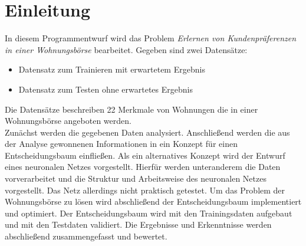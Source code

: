 \section{Einleitung}\label{sec:einleitung}
In diesem Programmentwurf wird das Problem \emph{Erlernen von Kundenpräferenzen in einer Wohnungsbörse}
bearbeitet. Gegeben sind zwei Datensätze: 
\begin{itemize}
    \item Datensatz zum Trainieren mit erwartetem Ergebnis
    \item Datensatz zum Testen ohne erwartetes Ergebnis
\end{itemize}

Die Datensätze beschreiben 22 Merkmale von Wohnungen die in einer Wohnungsbörse angeboten werden. \\
Zunächst werden die gegebenen Daten analysiert. Anschließend werden die aus der Analyse gewonnenen Informationen 
in ein Konzept für einen Entscheidungsbaum einfließen. 
Als ein alternatives Konzept wird der Entwurf eines neuronalen Netzes vorgestellt. Hierfür werden unteranderem
die Daten vorverarbeitet und die Struktur und Arbeitsweise des neuronalen Netzes vorgestellt. Das Netz allerdings nicht praktisch getestet. 
Um das Problem der Wohnungsbörse zu lösen wird abschließend der Entscheidungsbaum implementiert und optimiert. 
Der Entscheidungsbaum wird mit den Trainingsdaten aufgebaut und mit den Testdaten validiert.
Die Ergebnisse und Erkenntnisse werden abschließend zusammengefasst und bewertet.